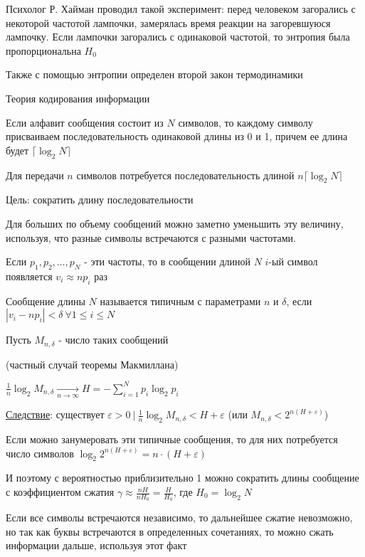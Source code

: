 \documentclass[12pt]{article}
\begin{document}

 Психолог Р. Хайман проводил такой эксперимент: перед человеком загорались с некоторой частотой лампочки, замерялась время реакции на загоревшуюся лампочку. 
Если лампочки загорались с одинаковой частотой, то энтропия была пропорциональна $H_0$

 Также с помощью энтропии определен второй закон термодинамики

 Теория кодирования информации

Если алфавит сообщения состоит из $N$ символов, то каждому символу присваиваем последовательность одинаковой длины из 0 и 1, 
причем ее длина будет $\lceil\log_2 N\rceil$

Для передачи $n$ символов потребуется последовательность длиной $n\lceil\log_2 N\rceil$

Цель: сократить длину последовательности

Для больших по объему сообщений можно заметно уменьшить эту величину, используя, что разные символы встречаются с разными частотами.

Если $p_1, p_2, \dots, p_N$ - эти частоты, то в сообщении длиной $N$ $i$-ый символ появляется $v_i \approx n p_i$ раз 

\Def Сообщение длины $N$ называется типичным с параметрами $n$ и $\delta$, если $|v_i - n p_i| < \delta \ \forall 1 \leq i \leq N$

Пусть $M_{n, \delta}$ - число таких сообщений

\begin{MyTheorem}
    \Ths (частный случай теоремы Макмиллана)

    $\frac{1}{n} \log_2 M_{n, \delta} \underset{n \to \infty}{\longrightarrow} H = -\sum_{i = 1}^N p_i \log_2 p_i$
\end{MyTheorem}

\underline{Следствие}: существует $\varepsilon > 0 \ | \ \frac{1}{n} \log_2 M_{n,\delta} < H + \varepsilon$ (или $M_{n, \delta} < 2^{n(H + \varepsilon)}$)

Если можно занумеровать эти типичные сообщения, то для них потребуется число символов $\log_2 2^{n(H + \varepsilon)} = n \cdot (H + \varepsilon)$

И поэтому с вероятностью приблизительно 1 можно сократить длины сообщение с коэффициентом сжатия $\gamma \approx \frac{nH}{nH_0} = \frac{H}{H_0}$, где $H_0 = \log_2 N$

Если все символы встречаются независимо, то дальнейшее сжатие невозможно, но так как буквы встречаются в определенных сочетаниях, то можно сжать 
информации дальше, используя этот факт
\end{document}
